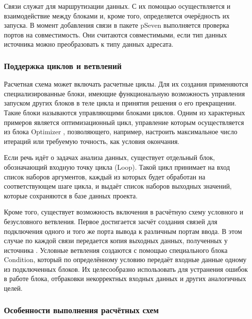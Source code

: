 Связи служат для маршрутизации данных. С их помощью осуществляется и взаимодействие между блоками и, кроме того, определяется очерёдность их запуска. В момент добавления связи в пакете \textsf{pSeven} выполняется проверка портов на совместимость. Они считаются совместимыми, если тип данных источника можно преобразовать к типу данных адресата.\cite{pSevenDocsWorkflow2021}

\subsubsection{Поддержка циклов и ветвлений}

Расчетная схема может включать расчетные циклы. Для их создания применяются специализированные блоки, имеющие функциональную возможность управления запуском других блоков в теле цикла и принятия решения о его прекращении. Такие блоки называются управляющими блоками циклов. Одним из характерных примеров является оптимизационный цикл, управление которым осуществляется из блока \textsf{Optimizer} \cite{pSevenDocsWorkflow2021}, позволяющего, например, настроить максимальное число итераций или требуемую точность, как условия окончания.

Если речь идёт о задачах анализа данных, существует отдельный блок, обозначающий входную точку цикла (\textsf{Loop}). Такой цикл принимает на вход список наборов аргументов, каждый из которых будет обработан на соответствующем шаге цикла, и выдаёт список наборов выходных значений, которые сохраняются в базе данных проекта.

Кроме того, существует возможность включения в расчётную схему условного и безусловного ветвления. Первое достигается засчёт создания связей для подключения одного и того же порта вывода к различным портам ввода. В этом случае по каждой связи передается копия выходных данных, полученных у источника \cite{pSevenDocsWorkflow2021}. Условные ветвления создаются с помощью специального блока \textsf{Condition}, который по определённому условию передаёт входные данные одному из подключенных блоков. Их целесообразно использовать для устранения ошибок в работе блока, отбраковки некорректных входных данных и других аналогичных целей\cite{pSevenDocsWorkflow2021}.

\subsubsection{Особенности выполнения расчётных схем}

